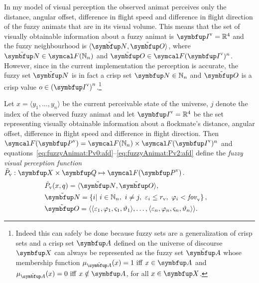 In my model of visual perception the observed animat perceives only the distance, angular offset, difference in flight speed and difference in flight direction of the fuzzy animats that are in its visual volume. This means that the set of visually obtainable information about a fuzzy animat is $\set{I}^\textnormal{v}=\R^4$ and the fuzzy neighbourhood is $\langle\fset{N},\fset{O}\rangle$, where $\fset{N} \in \fpowset{\N_n}$ and $\fset{O} \in \fpowset{\set{I}^\textnormal{v}}^n$. However, since in the current implementation the perception is accurate, the fuzzy set $\fset{N}$ is in fact a crisp set $\set{N} \in \N_n$ and $\fset{O}$ is a crisp value $o \in {(\set{I}^\textnormal{v})}^n$.\footnote{Indeed this can safely be done because fuzzy sets are a generalization of crisp sets and a crisp set $\set{A}$ defined on the universe of discourse $\set{X}$ can always be represented as the fuzzy set $\fset{A}$ whose membership function $\mu_\fset{A}(x)=1\ \mathrm{iff}\ x \in \set{A}$ and $\mu_\fset{A}(x)=0\ \mathrm{iff}\ x \notin \set{A}$, for all $x \in \set{X}$.}

\begin{definition}
	\label{def:fuzzyAnimat:Pv:afd}
	Let $x=\langle y_1,\ldots,y_n\rangle$ be the current perceivable state of the universe, $j$ denote the index of the observed fuzzy animat and let $\set{I}^\textnormal{v}=\R^4$ be the set representing visually obtainable information about a flockmate's distance, angular offset, difference in flight speed and difference in flight direction. Then $\fpowset{\set{P}^\textnormal{v}}=\fpowset{\N_n} \times \fpowset{\set{I}^\textnormal{v}}^n$ and equations~\eqref{eq:fuzzyAnimat:Pv0:afd}--\eqref{eq:fuzzyAnimat:Pv2:afd} define the \emph{fuzzy visual perception function} $\ffunc{P}_\textnormal{v}: \set{X} \times \set{Q} \mapsto \fpowset{\set{P}^\textnormal{v}}$.
	\begin{eqnarray}
		& \ffunc{P}_\textnormal{v}(x,q)=\langle\fset{N},\fset{O}\rangle, & \label{eq:fuzzyAnimat:Pv0:afd} \\
		& \fset{N}=\left\{i|\ i \in \N_n,\ i \neq j,\ \varepsilon_i%
		 \leq r_\textnormal{v},\ \varphi_i%
		 < \fov_\textnormal{v} \right\}, & \\ 
		& \fset{O}=\langle \langle \varepsilon_1, \varphi_1, \varsigma_1, \vartheta_1 \rangle, \ldots,
		\langle \varepsilon_n, \varphi_n, \varsigma_n, \vartheta_n \rangle \rangle. & \label{eq:fuzzyAnimat:Pv2:afd}
	\end{eqnarray}
\end{definition}
 
